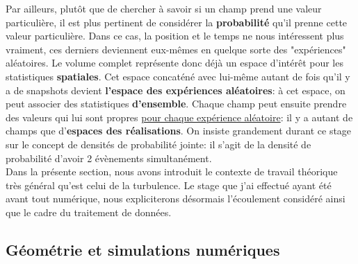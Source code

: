 \documentclass[13pt, a4paper]{extarticle}
\begin{document}
\noindent Par ailleurs, plutôt que de chercher à savoir si un champ prend une 
valeur particulière, il est plus pertinent de considérer la {\bf probabilité} 
qu'il prenne cette valeur particulière. Dans ce cas, la position et le temps ne 
nous intéressent plus vraiment, ces derniers deviennent eux-mêmes en quelque 
sorte des "expériences" aléatoires. Le volume complet représente 
donc déjà un espace d'intérêt pour les statistiques {\bf spatiales}. Cet espace 
concaténé avec lui-même autant de fois qu'il y a de snapshots
devient {\bf l'espace des expériences aléatoires}: à cet espace, on peut associer
des statistiques {\bf d'ensemble}. Chaque champ
peut ensuite prendre des valeurs qui lui sont propres \underline{pour chaque expérience 
aléatoire}: il y a autant de champs que d'{\bf espaces des réalisations}. On 
insiste grandement durant ce stage sur le concept de densités de probabilité 
jointe: il s'agit de la densité de probabilité d'avoir 2 évènements simultanément.\\

\noindent Dans la présente section, nous avons introduit le contexte de travail 
théorique très général qu'est celui de la turbulence. Le stage que j'ai effectué 
ayant été avant tout numérique, nous expliciterons désormais l'écoulement considéré 
ainsi que le cadre du traitement de données.

\subsection{Géométrie et simulations numériques}
\end{document}
